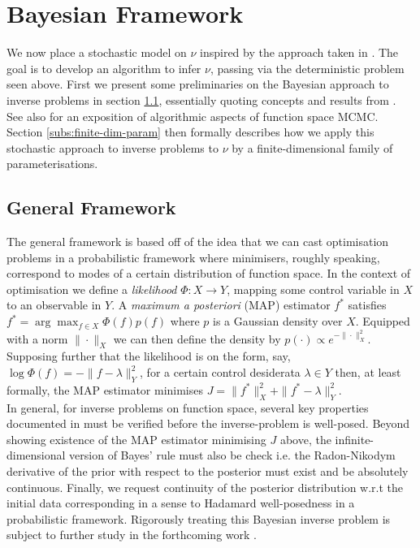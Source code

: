\documentclass[runningheads]{llncs}
\begin{document}
\section{Bayesian Framework}\label{sec:bayesian}

We now place a stochastic model on $\nu$ inspired by the approach taken in
\cite{cotter2013bayesian}. The goal is to develop an algorithm to infer $\nu$,
passing via the deterministic problem seen above.  First we present some
preliminaries on the Bayesian approach to inverse problems in section
\ref{subs:gf}, essentially quoting concepts and results from
\cite{dashti2017bayesian}. See also \cite{cotter2013mcmc} for an exposition of
algorithmic aspects of function space MCMC. Section \ref{subs:finite-dim-param}
then formally describes how we apply this stochastic approach to inverse
problems to $\nu$ by a finite-dimensional family of parameterisations.

\subsection{General Framework}\label{subs:gf}

The general framework is based off of the idea that we can cast optimisation
problems in a probabilistic framework where minimisers, roughly speaking,
correspond to modes of a certain distribution of function space.  In the context
of optimisation we define a \emph{likelihood} $\Phi : X\rightarrow Y$, mapping
some control variable in $X$ to an observable in $Y$.  A \emph{maximum a
posteriori} (MAP) estimator $f^*$ satisfies $f^* = \arg\max_{f\in X} \Phi(f)
p(f)$ where $p$ is a Gaussian density over $X$. Equipped with a norm
$\|\cdot\|_X$ we can then define the density by $p(\cdot) \propto
e^{-\|\cdot\|_X^2}$.  Supposing further that the likelihood is on the form, say,
$\log \Phi(f) = -\|f-\lambda\|_Y^2$, for a certain control desiderata $\lambda\in Y$
then, at least formally, the MAP estimator minimises $J =\|f^*\|_X^2 +
\|f^*-\lambda\|_Y^2$.\\

In general, for inverse problems on function space, several key properties
documented in \cite{dashti2017bayesian} must be verified before the
inverse-problem is well-posed. Beyond showing existence of the MAP estimator
minimising $J$ above, the infinite-dimensional version of Bayes' rule must also
be check i.e. the Radon-Nikodym derivative of the prior with respect to the
posterior must exist and be absolutely continuous. Finally, we request
continuity of the posterior distribution w.r.t the initial data corresponding in
a sense to Hadamard well-posedness in a probabilistic framework. Rigorously
treating this Bayesian inverse problem is subject to further study in the
forthcoming work \cite{bockarnaudoncotter2019}.
\end{document}
